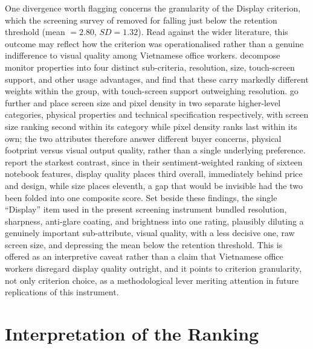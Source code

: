 One divergence worth flagging concerns the granularity of the Display criterion, which the
screening survey of  removed for falling just below the retention
threshold (mean $=2.80$, $SD=1.32$). Read against the wider literature, this outcome may
reflect how the criterion was operationalised rather than a genuine indifference to visual
quality among Vietnamese office workers. \textcite{sonmez_cakir_determination_2020}
decompose monitor properties into four distinct sub-criteria, resolution, size,
touch-screen support, and other usage advantages, and find that these carry markedly
different weights within the group, with touch-screen support outweighing resolution.
\textcite{weng_siew_lam_evaluation_2023} go further and place screen size and pixel density
in two separate higher-level categories, physical properties and technical specification
respectively, with screen size ranking second within its category while pixel density ranks
last within its own; the two attributes therefore answer different buyer concerns, physical
footprint versus visual output quality, rather than a single underlying preference.
\textcite{maghsoudi_hybrid_2026} report the starkest contrast, since in their
sentiment-weighted ranking of sixteen notebook features, display quality places third
overall, immediately behind price and design, while size places eleventh, a gap that would
be invisible had the two been folded into one composite score. Set beside these findings, the single ``Display''
item used in the present screening instrument bundled resolution, sharpness, anti-glare
coating, and brightness into one rating, plausibly diluting a genuinely important
sub-attribute, visual quality, with a less decisive one, raw screen size, and depressing the
mean below the retention threshold. This is offered as an interpretive caveat rather than a
claim that Vietnamese office workers disregard display quality outright, and it points to
criterion granularity, not only criterion choice, as a methodological lever meriting
attention in future replications of this instrument.

\section{Interpretation of the Ranking}\label{sec:interp-ranking}


